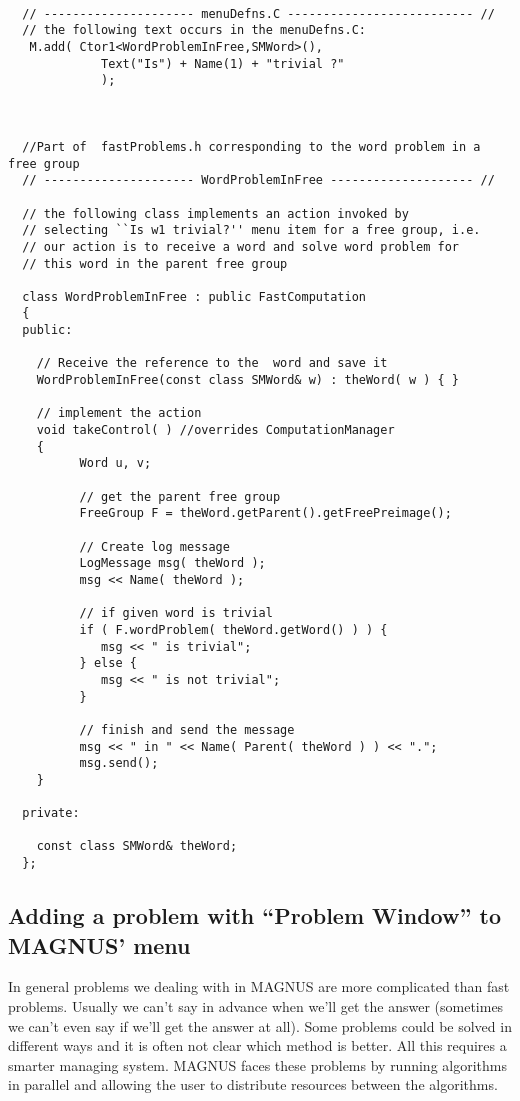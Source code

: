 \documentclass[12pt]{article}
\begin{document}
  \scriptsize
  \begin{verbatim}

  // --------------------- menuDefns.C -------------------------- //
  // the following text occurs in the menuDefns.C:
   M.add( Ctor1<WordProblemInFree,SMWord>(),
             Text("Is") + Name(1) + "trivial ?" 
             );



  //Part of  fastProblems.h corresponding to the word problem in a free group
  // --------------------- WordProblemInFree -------------------- //

  // the following class implements an action invoked by
  // selecting ``Is w1 trivial?'' menu item for a free group, i.e.
  // our action is to receive a word and solve word problem for 
  // this word in the parent free group

  class WordProblemInFree : public FastComputation
  {
  public:

    // Receive the reference to the  word and save it
    WordProblemInFree(const class SMWord& w) : theWord( w ) { }

    // implement the action
    void takeControl( ) //overrides ComputationManager
    {
          Word u, v;

          // get the parent free group
          FreeGroup F = theWord.getParent().getFreePreimage();

          // Create log message
          LogMessage msg( theWord );
          msg << Name( theWord );

          // if given word is trivial
          if ( F.wordProblem( theWord.getWord() ) ) {
             msg << " is trivial";
          } else {
             msg << " is not trivial";
          }

          // finish and send the message
          msg << " in " << Name( Parent( theWord ) ) << ".";
          msg.send();
    }
    
  private:

    const class SMWord& theWord;
  };
  \end{verbatim}
  \normalsize
 
  \subsection{Adding a problem with ``Problem Window'' to MAGNUS' menu}

  In general problems we dealing with in MAGNUS are more complicated than
  fast problems. Usually we can't say 
  in advance when we'll get the answer (sometimes we can't even say if we'll get
   the answer at all). Some problems could be solved in different ways and it is 
  often 
  not clear which method is better. All this requires a smarter managing system. 
  MAGNUS
  faces these problems by running algorithms in parallel and allowing the user to 
  distribute resources between the algorithms. 
\end{document}

